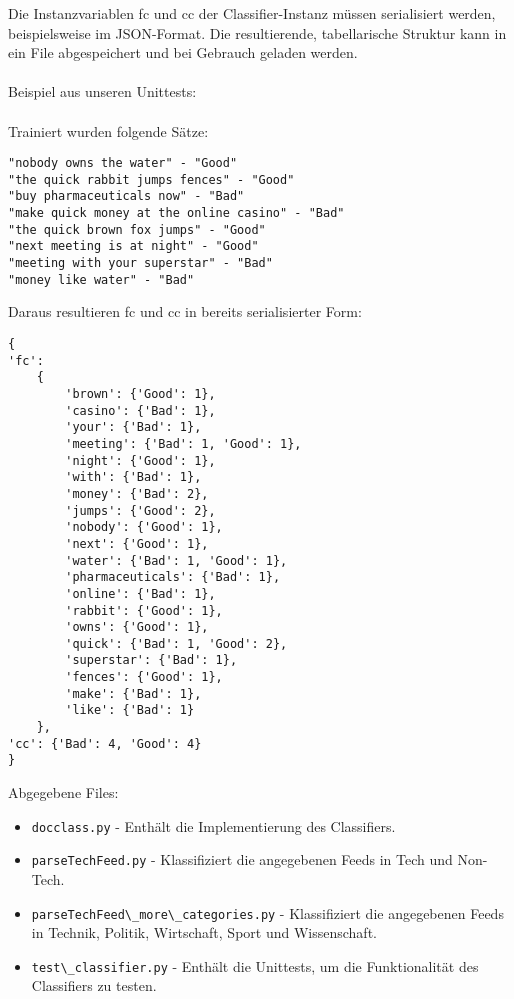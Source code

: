 \documentclass[12pt,a4paper]{scrartcl}
\begin{document}
Die Instanzvariablen fc und cc der Classifier-Instanz  m\"ussen serialisiert werden, beispielsweise im JSON-Format. Die resultierende, tabellarische Struktur kann in ein File abgespeichert und bei Gebrauch geladen werden. 
\\\\
Beispiel aus unseren Unittests:
\\\\
Trainiert wurden folgende S\"atze:
\begin{lstlisting}
"nobody owns the water" - "Good"
"the quick rabbit jumps fences" - "Good"
"buy pharmaceuticals now" -	"Bad"
"make quick money at the online casino" - "Bad"
"the quick brown fox jumps" - "Good"
"next meeting is at night" - "Good"
"meeting with your superstar" - "Bad"
"money like water" - "Bad"
\end{lstlisting}

Daraus resultieren fc und cc in bereits serialisierter Form:

\begin{lstlisting}
{
'fc':
	{
		'brown': {'Good': 1}, 
		'casino': {'Bad': 1}, 
		'your': {'Bad': 1}, 
		'meeting': {'Bad': 1, 'Good': 1}, 
		'night': {'Good': 1}, 
		'with': {'Bad': 1}, 
		'money': {'Bad': 2}, 
		'jumps': {'Good': 2}, 
		'nobody': {'Good': 1}, 
		'next': {'Good': 1}, 
		'water': {'Bad': 1, 'Good': 1}, 
		'pharmaceuticals': {'Bad': 1}, 
		'online': {'Bad': 1}, 
		'rabbit': {'Good': 1}, 
		'owns': {'Good': 1}, 
		'quick': {'Bad': 1, 'Good': 2}, 
		'superstar': {'Bad': 1}, 
		'fences': {'Good': 1}, 
		'make': {'Bad': 1}, 
		'like': {'Bad': 1}	
	}, 
'cc': {'Bad': 4, 'Good': 4}
}
\end{lstlisting}


Abgegebene Files:
\begin{itemize}
\item{\lstinline{docclass.py} - Enth\"alt die Implementierung des Classifiers.}
\item{\lstinline{parseTechFeed.py} - Klassifiziert die angegebenen Feeds in Tech und Non-Tech.}
\item{\lstinline{parseTechFeed\_more\_categories.py} - Klassifiziert die angegebenen Feeds in Technik, Politik, Wirtschaft, Sport und Wissenschaft.}
\item{\lstinline{test\_classifier.py} - Enth\"alt die Unittests, um die Funktionalit\"at des Classifiers zu testen.}
\end{itemize}
\end{document}
